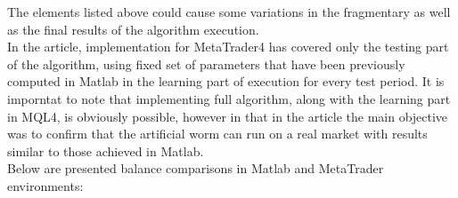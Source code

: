 \documentclass[runningheads,a4paper]{llncs}
\begin{document}
The elements listed above could cause some variations in the fragmentary as well as the final results of the algorithm execution.\\

In the article, implementation for MetaTrader4 has covered only the testing part of the algorithm, using fixed set of parameters that have been previously computed in Matlab in the learning part of execution for every test period. It is imporntat to note that implementing full algorithm, along with the learning part in MQL4, is obviously possible, however in that in the article the main objective was to confirm that the artificial worm can run on a real market with results similar to those achieved in Matlab.\\

Below are presented balance comparisons in Matlab and MetaTrader environments:
\end{document}
